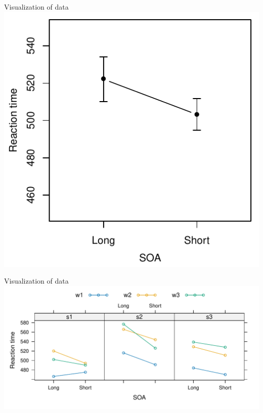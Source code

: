 \documentclass[aspectratio=169]{beamer}
\begin{document}
\begin{frame}{Visualization of data}
  \centering
\includegraphics[scale=.8]{../figures/baayen_ex_agg}
\end{frame}

\begin{frame}{Visualization of data}
\includegraphics[scale=.65]{../figures/baayen_ex}
\end{frame}
\end{document}
